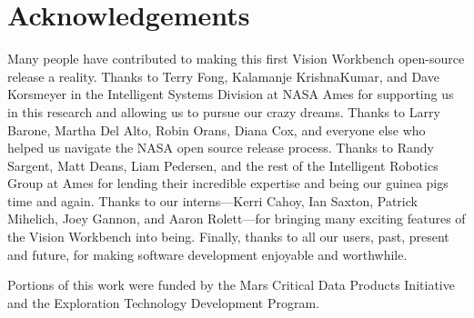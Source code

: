 \chapter*{Acknowledgements}

Many people have contributed to making this first Vision Workbench
open-source release a reality.  Thanks to Terry Fong, Kalamanje
KrishnaKumar, and Dave Korsmeyer in the Intelligent Systems Division
at NASA Ames for supporting us in this research and allowing us to
pursue our crazy dreams.  Thanks to Larry Barone, Martha Del Alto,
Robin Orans, Diana Cox, and everyone else who helped us navigate the
NASA open source release process.  Thanks to Randy Sargent, Matt
Deans, Liam Pedersen, and the rest of the Intelligent Robotics Group
at Ames for lending their incredible expertise and being our guinea
pigs time and again.  Thanks to our interns---Kerri Cahoy, Ian Saxton,
Patrick Mihelich, Joey Gannon, and Aaron Rolett---for bringing many
exciting features of the Vision Workbench into being.  Finally, thanks
to all our users, past, present and future, for making software
development enjoyable and worthwhile.

Portions of this work were funded by the Mars Critical Data Products
Initiative and the Exploration Technology Development Program.
